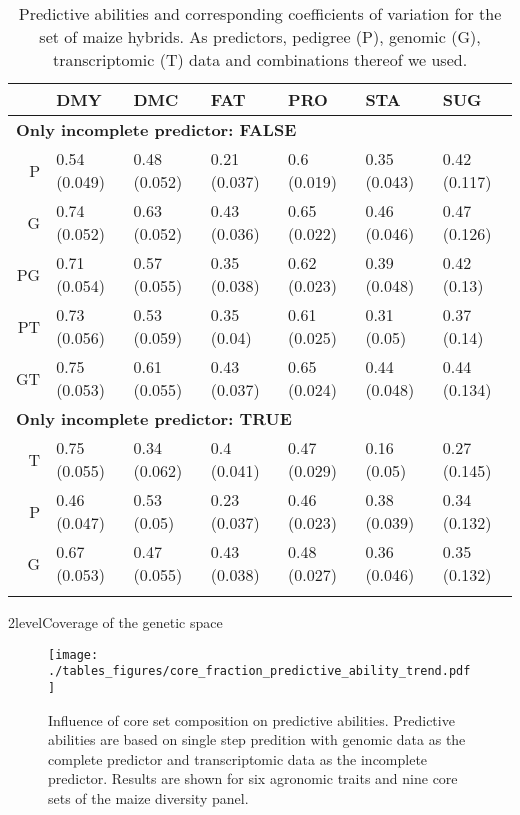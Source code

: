 \documentclass[12pt,titlepage]{article}
\begin{document}
\begin{table}[ht]
\label{tbl:HybridTable}
\centering
\caption{Predictive abilities and corresponding coefficients of variation for the set of maize hybrids. As predictors, pedigree (P), genomic (G), transcriptomic (T) data and combinations thereof we used.} 
\begin{tabular}{rllllll}
  \toprule
 & DMY & DMC & FAT & PRO & STA & SUG \\ 
  \midrule
\multicolumn{6}{l}{{\bfseries Only incomplete predictor: FALSE}}\\
P & 0.54 (0.049) & 0.48 (0.052) & 0.21 (0.037) & 0.6 (0.019) & 0.35 (0.043) & 0.42 (0.117) \\ 
  G & 0.74 (0.052) & 0.63 (0.052) & 0.43 (0.036) & 0.65 (0.022) & 0.46 (0.046) & 0.47 (0.126) \\ 
  PG & 0.71 (0.054) & 0.57 (0.055) & 0.35 (0.038) & 0.62 (0.023) & 0.39 (0.048) & 0.42 (0.13) \\ 
  PT & 0.73 (0.056) & 0.53 (0.059) & 0.35 (0.04) & 0.61 (0.025) & 0.31 (0.05) & 0.37 (0.14) \\ 
  GT & 0.75 (0.053) & 0.61 (0.055) & 0.43 (0.037) & 0.65 (0.024) & 0.44 (0.048) & 0.44 (0.134) \\ 
   \midrule
\multicolumn{6}{l}{{\bfseries Only incomplete predictor: TRUE}}\\
T & 0.75 (0.055) & 0.34 (0.062) & 0.4 (0.041) & 0.47 (0.029) & 0.16 (0.05) & 0.27 (0.145) \\ 
  P & 0.46 (0.047) & 0.53 (0.05) & 0.23 (0.037) & 0.46 (0.023) & 0.38 (0.039) & 0.34 (0.132) \\ 
  G & 0.67 (0.053) & 0.47 (0.055) & 0.43 (0.038) & 0.48 (0.027) & 0.36 (0.046) & 0.35 (0.132) \\ 
   \bottomrule
\multicolumn{6}{l}{}\\
\end{tabular}
\end{table}









\Genetics2level{Coverage of the genetic space}

\begin{figure}[H]
\centering
\texttt{[image: ./tables\_figures/core\_fraction\_predictive\_ability\_trend.pdf]}
\caption{
Influence of core set composition on predictive abilities.
Predictive abilities are based on single step predition with genomic data as the 
complete predictor and transcriptomic data as the incomplete predictor.
Results are shown for six agronomic traits and nine core sets of the maize 
diversity panel.
}
\label{fig:CoreSetInfluence}
\end{figure}
\end{document}
